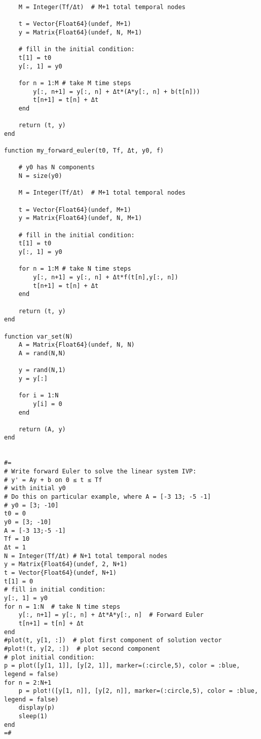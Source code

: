 \documentclass[a4paper,10pt,BCOR10mm,oneside,headsepline]{scrartcl}
\begin{document}
\begin{lstlisting}
    M = Integer(Tf/Δt)  # M+1 total temporal nodes

    t = Vector{Float64}(undef, M+1)
    y = Matrix{Float64}(undef, N, M+1)

    # fill in the initial condition:
    t[1] = t0
    y[:, 1] = y0

    for n = 1:M # take M time steps
        y[:, n+1] = y[:, n] + Δt*(A*y[:, n] + b(t[n]))
        t[n+1] = t[n] + Δt
    end

    return (t, y)
end

function my_forward_euler(t0, Tf, Δt, y0, f)

    # y0 has N components
    N = size(y0)

    M = Integer(Tf/Δt)  # M+1 total temporal nodes

    t = Vector{Float64}(undef, M+1)
    y = Matrix{Float64}(undef, N, M+1)

    # fill in the initial condition:
    t[1] = t0
    y[:, 1] = y0

    for n = 1:M # take N time steps
        y[:, n+1] = y[:, n] + Δt*f(t[n],y[:, n])
        t[n+1] = t[n] + Δt
    end

    return (t, y)
end

function var_set(N)
    A = Matrix{Float64}(undef, N, N)
    A = rand(N,N)

    y = rand(N,1)
    y = y[:]

    for i = 1:N
        y[i] = 0
    end

    return (A, y)
end


#=
# Write forward Euler to solve the linear system IVP:
# y' = Ay + b on 0 ≤ t ≤ Tf
# with initial y0
# Do this on particular example, where A = [-3 13; -5 -1]
# y0 = [3; -10]
t0 = 0
y0 = [3; -10]
A = [-3 13;-5 -1]
Tf = 10
Δt = 1
N = Integer(Tf/Δt) # N+1 total temporal nodes
y = Matrix{Float64}(undef, 2, N+1)
t = Vector{Float64}(undef, N+1)
t[1] = 0
# fill in initial condition:
y[:, 1] = y0
for n = 1:N  # take N time steps
    y[:, n+1] = y[:, n] + Δt*A*y[:, n]  # Forward Euler
    t[n+1] = t[n] + Δt
end
#plot(t, y[1, :])  # plot first component of solution vector
#plot!(t, y[2, :])  # plot second component
# plot initial condition:
p = plot([y[1, 1]], [y[2, 1]], marker=(:circle,5), color = :blue, legend = false)
for n = 2:N+1
    p = plot!([y[1, n]], [y[2, n]], marker=(:circle,5), color = :blue, legend = false)
    display(p)
    sleep(1)
end
=#

\end{lstlisting}
\end{document}
